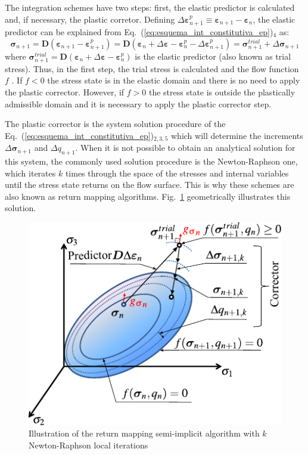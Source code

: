 \documentclass[Journal,letterpaper]{ascelike-new}
\newcommand{\Dsdee}{\boldsymbol{D}}
\newcommand{\strain}{\boldsymbol{\varepsilon}}
\newcommand{\strainp}{\boldsymbol{\varepsilon}^{p}}
\newcommand{\stress}{\boldsymbol{\sigma}}
\begin{document}
The integration schemes have two steps: first, the elastic predictor is calculated and, if necessary, the plastic corretor. Defining  $\Delta \strainp_{n+1} \equiv \strain_{n+1} - \strain_{n}$, the elastic predictor can be explained from Eq.~(\ref{eq:esquema_int_constitutiva_ep})$_4$ as: 
\begin{equation}
	\label{eq:preditor_elastico}
	\stress_{n+1} = \Dsdee(\strain_{n+1}-\strain_{n+1}^p) = \Dsdee(\strain_n+\Delta \strain-\strain_{n}^ p-\Delta \strain_{n+1}^p) = \stress_{n+1}^{trial} + \Delta \stress_{n+1}
\end{equation}
where $\stress_{n+1}^{trial} = \Dsdee (\strain_n+\Delta \strain-\strain_{n}^ p)$ is the elastic predictor (also known as trial stress). Thus, in the first step, the trial stress is calculated and the flow function $f$  . If  $f<0$  the stress state is in the elastic domain and there is no need to apply the plastic corrector. However, if $f>0$ the stress state is outside the plastically admissible domain and it is necessary to apply the plastic corrector step.

The plastic corrector is the system solution procedure of the Eq.~(\ref{eq:esquema_int_constitutiva_ep})$_{2,3,5}$ which will determine the increments $\Delta \stress_{n+1}$ and $\Delta q_{n+1}$. When it is not possible to obtain an analytical solution for this system, the commonly used solution procedure is the Newton-Raphson one, which iterates $k$ times through the space of the stresses and internal variables until the stress state returns on the flow surface. This is why these schemes are also known as return mapping algorithms. Fig.~\ref{ep-algorithm-representation} geometrically illustrates this solution.

\begin{figure}
	\centering
	\includegraphics[scale=1]{ep-algorithm-representation.pdf}
	\caption{Illustration of the return mapping semi-implicit algorithm with $k$ Newton-Raphson local iterations}
	\label{ep-algorithm-representation}
\end{figure}
\end{document}
